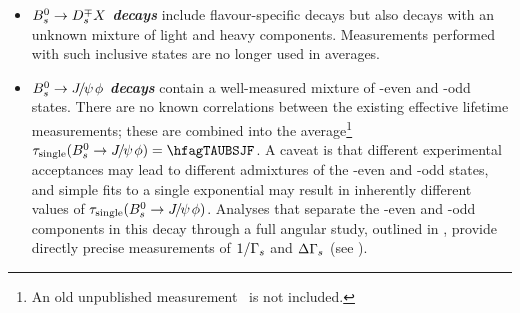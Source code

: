 \begin{itemize}
\item
{\bf\em \boldmath $B^0_s\to D_s^{\mp} X$ decays}
include flavour-specific decays but also decays 
with an unknown mixture of light and heavy components. 
Measurements performed with such inclusive states are
no longer used in averages. 

\item
{\bf\em 
{\boldmath $B^0_s \to {J\mskip -3mu/\mskip -2mu\psi\mskip 2mu}\phi$ \unboldmath}decays}
contain a well-measured mixture of \CP-even and \CP-odd states.
There are no known correlations
between the existing 
\particle{\Bs\to \jpsi\phi}
effective lifetime measurements; these are combined  
into the average\footnote{%
An old unpublished measurement~\cite{CDFnote8524:2007,*CDFnote8524:2007_cont} is not included.}
$\tau_{\rm single}(\Bs\to \jpsi \phi) = \hfagTAUBSJF$. %
A caveat is that different experimental acceptances
may lead to different admixtures of the 
\CP-even and \CP-odd states, and simple fits to a single
exponential may result in inherently different 
values of $\tau_{\rm single}(B^0_s\to {J\mskip -3mu/\mskip -2mu\psi\mskip 2mu} \phi)$.
Analyses that separate the \CP-even and \CP-odd components in
this decay through a full angular study, outlined in ,
provide directly precise measurements of $1/\Gamma_{s}$ and $\Delta\Gamma_{s}$ (see ).


\end{itemize}
